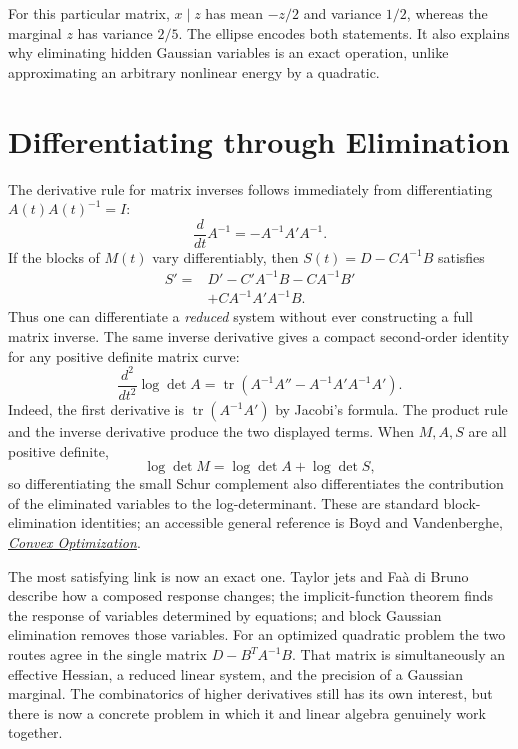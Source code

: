For this particular matrix, $x\mid z$ has mean $-z/2$ and variance $1/2$, whereas the marginal $z$ has variance $2/5$. The ellipse encodes both statements. It also explains why eliminating hidden Gaussian variables is an exact operation, unlike approximating an arbitrary nonlinear energy by a quadratic.

\section{Differentiating through Elimination}

The derivative rule for matrix inverses follows immediately from differentiating $A(t)A(t)^{-1}=I$:
\[
 \boxed{\frac d{dt}A^{-1}=-A^{-1}A'A^{-1}.}
\]
If the blocks of $M(t)$ vary differentiably, then $S(t)=D-CA^{-1}B$ satisfies
\[
 \begin{aligned}
 S'={}&D'-C'A^{-1}B-CA^{-1}B'\\
     &+CA^{-1}A'A^{-1}B.
 \end{aligned}
\]
Thus one can differentiate a \emph{reduced} system without ever constructing a full matrix inverse. The same inverse derivative gives a compact second-order identity for any positive definite matrix curve:
\[
 \boxed{\frac{d^2}{dt^2}\log\det A
 =\operatorname{tr}\!\left(A^{-1}A''
           -A^{-1}A'A^{-1}A'\right).}
\]
Indeed, the first derivative is $\operatorname{tr}(A^{-1}A')$ by Jacobi's formula. The product rule and the inverse derivative produce the two displayed terms. When $M,A,S$ are all positive definite,
\[
 \log\det M=\log\det A+\log\det S,
\]
so differentiating the small Schur complement also differentiates the contribution of the eliminated variables to the log-determinant. These are standard block-elimination identities; an accessible general reference is Boyd and Vandenberghe, \href{https://www.stanford.edu/~boyd/cvxbook/bv_cvxbook.pdf}{\emph{Convex Optimization}}.

The most satisfying link is now an exact one. Taylor jets and Fa\`a di Bruno describe how a composed response changes; the implicit-function theorem finds the response of variables determined by equations; and block Gaussian elimination removes those variables. For an optimized quadratic problem the two routes agree in the single matrix $D-B^TA^{-1}B$. That matrix is simultaneously an effective Hessian, a reduced linear system, and the precision of a Gaussian marginal. The combinatorics of higher derivatives still has its own interest, but there is now a concrete problem in which it and linear algebra genuinely work together.
